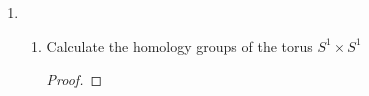 \documentclass{article}
\begin{document}
\begin{enumerate}
	\item \begin{enumerate} 
		\item Calculate the homology groups of the torus $S^1 \times S^1$
		\begin{proof}
			
			
		\end{proof}
		
		\end{enumerate}
\end{enumerate}
\end{document}
